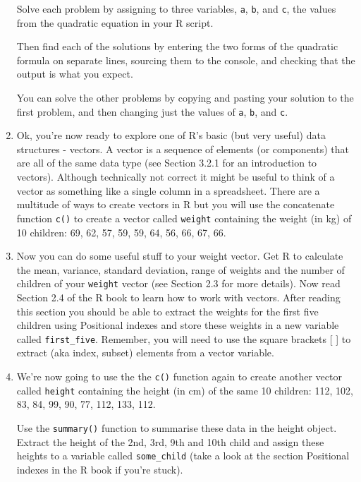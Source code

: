 \documentclass[12pt]{article}
\newcommand{\lst}[1]{\lstinline{#1}}
\begin{document}
\begin{enumerate}
 Solve each problem by assigning to three variables, \lstinline{a},
 \lstinline{b}, and
 \lstinline{c}, the values from the quadratic equation
 in your R script.
 
 Then find each of the solutions by entering the two forms of the quadratic 
 formula on separate lines, sourcing them to the console, and checking
 that the output is what you expect.
 
 You can solve the other problems by copying and pasting
 your solution to the first problem, and then changing just the values
 of  \lstinline{a},
 \lstinline{b}, and
 \lstinline{c}.
 
 
\item  Ok, you’re now ready to explore one of R’s basic (but very useful) data structures - vectors. A vector is a sequence of elements (or components) that are all of the same data type (see Section 3.2.1 for an introduction to vectors). Although technically not correct it might be useful to think of a vector as something like a single column in a spreadsheet. There are a multitude of ways to create vectors in R but you will use the concatenate function \lst{c()}
 to create a vector called \lst{weight} containing the weight (in kg) of 10 children: 
 69, 62, 57, 59, 59, 64, 56, 66, 67, 66.

 

\item Now you can do some useful stuff to your weight vector. Get R to calculate the mean, variance, standard deviation, range of weights and the number of children of your \lst{weight} vector (see Section 2.3 for more details). Now read Section 2.4 of the R book to learn how to work with vectors. After reading this section you should be able to extract the weights for the first five children using Positional indexes and store these weights in a new variable called 
\lstinline{first_five}. Remember, you will need to use the square brackets [ ] to extract (aka index, subset) elements from a vector variable.

 

\item We’re now going to use the the \lst{c()} function again to create another vector called 
\lst{height} containing the height (in cm) of the same 10 children: 112, 102, 83, 84, 99, 90, 77, 112, 133, 112. 

Use the \lst{summary()} function to summarise these data in the height object. Extract the height of the 2nd, 3rd, 9th and 10th child and assign these heights to a variable called \lst{some_child} (take a look at the section Positional indexes in the R book if you’re stuck). 


\end{enumerate}
\end{document}
